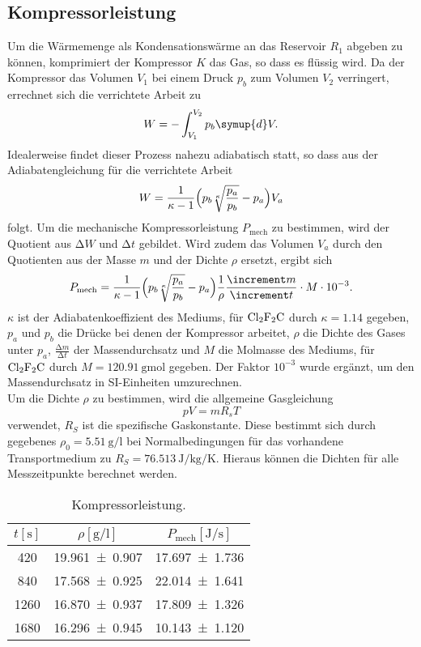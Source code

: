 \subsection{Kompressorleistung}
Um die Wärmemenge als Kondensationswärme an das Reservoir $R_1$ abgeben zu können, komprimiert der Kompressor $K$ das Gas, so dass es flüssig wird.
Da der Kompressor das Volumen $V_1$ bei einem Druck $p_b$ zum Volumen $V_2$ verringert, errechnet sich die verrichtete Arbeit zu
\begin{equation}
  W = - \int_{V_1}^{V_2} p_b \symup{d}V.
\end{equation}
Idealerweise findet dieser Prozess nahezu adiabatisch statt, so dass aus der Adiabatengleichung für die verrichtete Arbeit
\begin{equation}
  W = \frac{1}{\kappa -1}\Bigl(p_b \sqrt[\kappa]{\frac{p_a}{p_b}} - p_a \Bigr) V_a
\end{equation}
folgt.
Um die mechanische Kompressorleistung $P_{\text{mech}}$ zu bestimmen, wird der Quotient aus $\increment W$ und $\increment t$ gebildet.
Wird zudem das Volumen $V_a$ durch den Quotienten aus der Masse $m$ und der Dichte $\rho$ ersetzt, ergibt sich
\begin{equation}
  P_{\text{mech}} = \frac{1}{\kappa -1}\Bigl(p_b \sqrt[\kappa]{\frac{p_a}{p_b}} - p_a \Bigr) \frac{1}{\rho} \frac{\increment m}{\increment t} \cdot M \cdot 10^{-3}.
\end{equation}
$\kappa$ ist der Adiabatenkoeffizient des Mediums, für $\ce{Cl2F2C}$ durch $\kappa = 1.14$ gegeben, $p_a$ und $p_b$ die Drücke bei denen der Kompressor arbeitet, $\rho$ die Dichte des Gases unter $p_a$, $\frac{\increment m}{\increment t}$ der Massendurchsatz und $M$ die Molmasse des Mediums, für $\ce{Cl2F2C}$ durch $M = \SI{120.91}{\gram\mol}$ gegeben. Der Faktor $10^{-3}$ wurde ergänzt, um den Massendurchsatz in SI-Einheiten umzurechnen. \\
Um die Dichte $\rho$ zu bestimmen, wird die allgemeine Gasgleichung
\begin{equation}
  p V=m R_s T
\end{equation}
verwendet, $R_S$ ist die spezifische Gaskonstante. Diese bestimmt sich durch gegebenes $\rho_0=\SI{5,51}{\gram\per\litre}$ bei Normalbedingungen für das vorhandene Transportmedium zu $R_S = \SI{76.513}{\joule\per\kilogram\per\kelvin}$.
Hieraus können die Dichten für alle Messzeitpunkte berechnet werden.
\begin{table}
  \centering
  \caption{Kompressorleistung.}
  \label{tab:tabelle4}
\begin{tabular}{c c c}
  \toprule
  {$t [\si{\second}]$} & {$\rho [\si{\gram\per\litre}]$} & {$P_{\text{mech}} [\si{\joule\per\second}]$}\\
  \midrule
  \num{420} & \num{19.961 +- 0.907} & \num{17.697 +- 1.736} \\
  \num{840} & \num{17.568 +- 0.925} & \num{22.014 +- 1.641} \\
  \num{1260} & \num{16.870 +- 0.937} & \num{17.809 +- 1.326} \\
  \num{1680} & \num{16.296 +- 0.945} & \num{10.143 +- 1.120} \\
  \bottomrule
\end{tabular}
\end{table}
